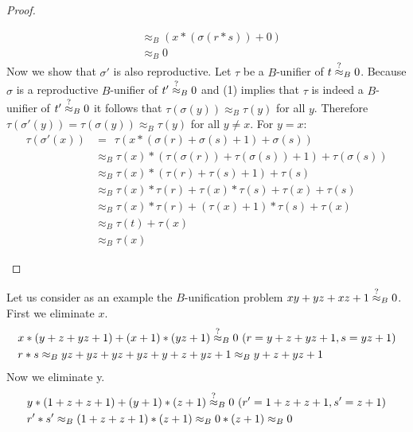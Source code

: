 \begin{proof}
\begin{itemize}
\begin{align*}
			      	           & \approx_B(x*(\sigma(r*s))+0)                                                                        \\
			      	           & \approx_B0                                                                                          
			      \end{align*}
			      Now we show that $\sigma'$ is also reproductive. Let $\tau$ be a $B$-unifier of $t\stackrel{?}{\approx}_B0$. Because $\sigma$ is a reproductive $B$-unifier of $t'\stackrel{?}{\approx}_B0$ and (1) implies that $\tau$ is indeed a $B$-unifier of $t'\stackrel{?}{\approx}_B0$ it follows that $\tau(\sigma(y))\approx_B\tau(y)$ for all $y$. Therefore $\tau(\sigma'(y))=\tau(\sigma(y))\approx_B\tau(y)$ for all $y\neq x$. For $y=x$:
			      \begin{align*}
			      	\tau(\sigma'(x)) & =\ \ \tau(x*(\sigma(r)+\sigma(s)+1)+\sigma(s))                        \\
			      	                 & \approx_B \tau(x)*(\tau(\sigma(r))+\tau(\sigma(s))+1)+\tau(\sigma(s)) \\
			      	                 & \approx_B \tau(x)*(\tau(r)+\tau(s)+1)+\tau(s)                         \\
			      	                 & \approx_B \tau(x)*\tau(r)+\tau(x)*\tau(s)+\tau(x)+\tau(s)             \\
			      	                 & \approx_B \tau(x)*\tau(r)+(\tau(x)+1)*\tau(s)+\tau(x)                 \\
			      	                 & \approx_B \tau(t)+\tau(x)                                             \\
			      	                 & \approx_B \tau(x)                                                     
			      \end{align*}
		\end{itemize}
	\end{proof}
	Let us consider as an example the $B$-unification problem $xy+yz+xz+1\stackrel{?}{\approx}_B0$. First we eliminate $x$.
	\begin{align*}
		  & x*(y+z+yz+1)+(x+1)*(yz+1)\approxq_B0\ (r=y+z+yz+1,s=yz+1) \\
		  & r*s\approx_Byz+yz+yz+yz+y+z+yz+1\approx_By+z+yz+1         
	\end{align*}
	Now we eliminate y.
	\begin{align*}
		  & y*(1+z+z+1)+(y+1)*(z+1)\stackrel{?}{\approx}_B0\ (r'=1+z+z+1,s'=z+1) \\
		  & r'*s'\approx_B(1+z+z+1)*(z+1)\approx_B0*(z+1)\approx_B0 
	\end{align*}
